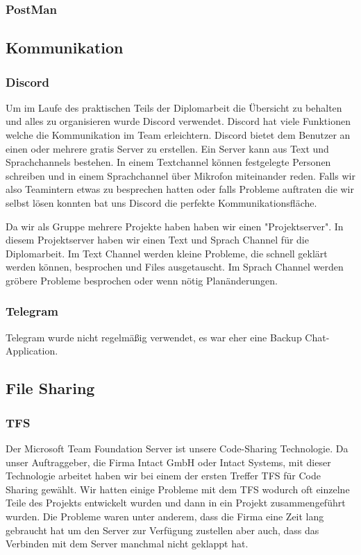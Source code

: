\documentclass[12pt]{scrartcl}
\begin{document}
\subsubsection {PostMan}


\subsection{Kommunikation}
\subsubsection {Discord}
Um im Laufe des praktischen Teils der Diplomarbeit die Übersicht zu behalten und alles zu organisieren wurde Discord verwendet. Discord hat viele Funktionen welche die Kommunikation im Team erleichtern. Discord bietet dem Benutzer an einen oder mehrere gratis Server zu erstellen. Ein Server kann aus Text und Sprachchannels bestehen. In einem Textchannel können festgelegte Personen schreiben und in einem Sprachchannel über Mikrofon miteinander reden. Falls wir also Teamintern etwas zu besprechen hatten oder falls Probleme auftraten die wir selbst lösen konnten bat uns Discord die perfekte Kommunikationsfläche. 

Da wir als Gruppe mehrere Projekte haben haben wir einen "Projektserver". In diesem Projektserver haben wir einen Text und Sprach Channel für die Diplomarbeit. Im Text Channel werden kleine Probleme, die schnell geklärt werden können, besprochen und Files ausgetauscht. Im Sprach Channel werden gröbere Probleme besprochen oder wenn nötig Planänderungen. 

\subsubsection {Telegram}
Telegram wurde nicht regelmäßig verwendet, es war eher eine Backup Chat-Application. 

\subsection{File Sharing}
\subsubsection {TFS}
Der Microsoft Team Foundation Server ist unsere Code-Sharing Technologie. Da unser Auftraggeber, die Firma Intact GmbH oder Intact Systems, mit dieser Technologie arbeitet haben wir bei einem der ersten Treffer TFS für Code Sharing gewählt. Wir hatten einige Probleme mit dem TFS wodurch oft einzelne Teile des Projekts entwickelt wurden und dann in ein Projekt zusammengeführt wurden. Die Probleme waren unter anderem, dass die Firma eine Zeit lang gebraucht hat um den Server zur Verfügung zustellen aber auch, dass das Verbinden mit dem Server manchmal nicht geklappt hat. 
\end{document}
